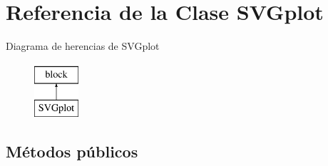 \hypertarget{classSVGplot}{}\section{Referencia de la Clase S\+V\+Gplot}
\label{classSVGplot}
Diagrama de herencias de S\+V\+Gplot\begin{figure}[H]
\begin{center}
\leavevmode
\includegraphics[height=2.000000cm]{classSVGplot}
\end{center}
\end{figure}
\subsection*{Métodos públicos}
